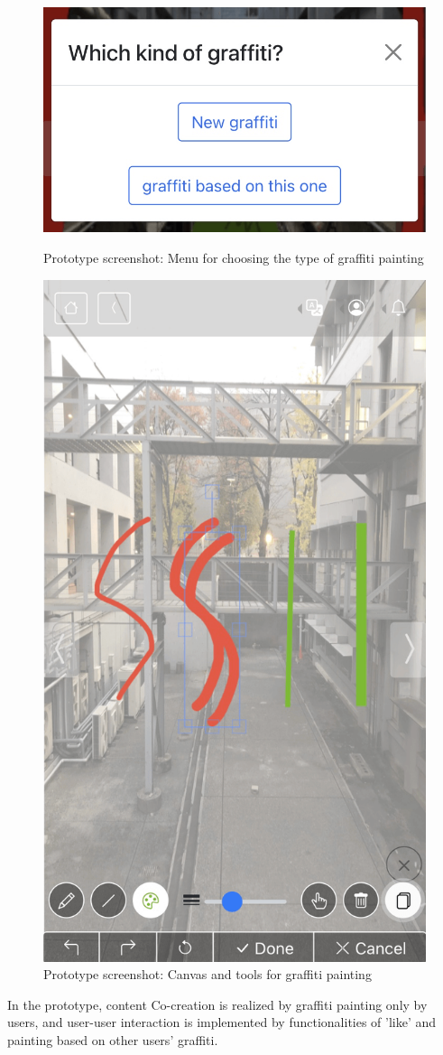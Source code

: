 \begin{figure}
  \begin{minipage}{0.48\textwidth}
    \centering
    \includegraphics[width=0.9\linewidth]{resources/4_methodology/prototype_choose_graffiti_type.png}
      \caption{Prototype screenshot: Menu for choosing the type of graffiti painting}
  \end{minipage}\hfill
  \begin{minipage}{0.48\textwidth}
    \centering
    \includegraphics[width=0.9\linewidth]{resources/4_methodology/prototype_canvas.png}
      \caption{Prototype screenshot: Canvas and tools for graffiti painting}
  \end{minipage}
\end{figure}

In the prototype, content Co-creation is realized by graffiti painting only by users,
and user-user interaction is implemented by functionalities of 'like' and painting based on other users' graffiti.
